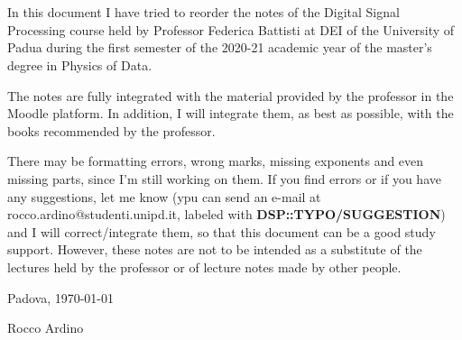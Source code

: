 \chapter*{}
\noindent In this document I have tried to reorder the notes of the Digital Signal Processing course held by Professor Federica Battisti at DEI of the University of Padua during the first semester of the 2020-21 academic year of the master's degree in Physics of Data.

The notes are fully integrated with the material provided by the professor in the Moodle platform. In addition, I will integrate them, as best as possible, with the books recommended by the professor.

There may be formatting errors, wrong marks, missing exponents and even missing parts, since I'm still working on them. If you find errors or if you have any suggestions, let me know (ypu can send an e-mail at rocco.ardino@studenti.unipd.it, labeled with \textbf{DSP::TYPO/SUGGESTION}) and I will correct/integrate them, so that this document can be a good study support. However, these notes are not to be intended as a substitute of the lectures held by the professor or of lecture notes made by other people.

\vspace{1cm}
\noindent \hfill Padova, \today

\hfill Rocco Ardino
